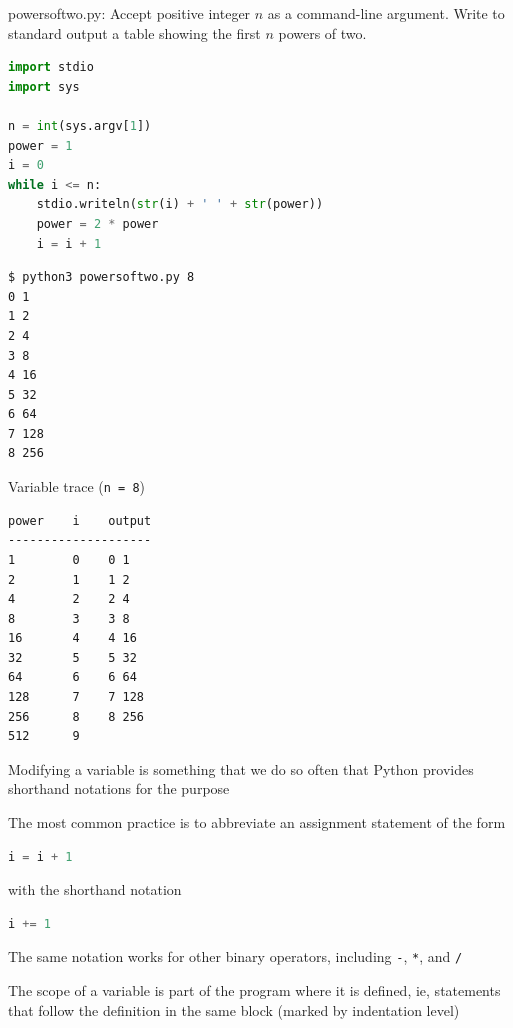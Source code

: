 \documentclass[8pt,a4paper,compress]{beamer}
\begin{document}
\begin{frame}[fragile]
\pause

\begin{framed}
\tiny powersoftwo.py: Accept positive integer $n$ as a command-line argument. Write to standard output a table showing the first $n$ powers of two.
\end{framed}

\begin{lstlisting}[language=Python]
import stdio
import sys

n = int(sys.argv[1])
power = 1
i = 0
while i <= n:
    stdio.writeln(str(i) + ' ' + str(power))    
    power = 2 * power
    i = i + 1
\end{lstlisting}

\pause

\begin{minipage}{150pt}
\begin{lstlisting}[language={}]
$ python3 powersoftwo.py 8
0 1
1 2
2 4
3 8
4 16
5 32
6 64
7 128
8 256
\end{lstlisting}
\end{minipage}\hfill
\begin{minipage}{100pt}
Variable trace (\lstinline{n = 8})
\begin{lstlisting}[language={}]
power    i    output
--------------------
1        0    0 1
2        1    1 2
4        2    2 4
8        3    3 8
16       4    4 16
32       5    5 32
64       6    6 64
128      7    7 128
256      8    8 256
512      9
\end{lstlisting}
\end{minipage}
\end{frame}

\begin{frame}[fragile]
\pause

Modifying a variable is something that we do so often that Python provides shorthand notations for the purpose

\pause
\bigskip

The most common practice is to abbreviate an assignment statement of the form 

\begin{lstlisting}[language=Python]
i = i + 1
\end{lstlisting}

with the shorthand notation

\begin{lstlisting}[language=Python]
i += 1
\end{lstlisting}

\pause
\bigskip

The same notation works for other binary operators, including \lstinline{-}, \lstinline{*}, and \lstinline{/}

\pause
\bigskip

The scope of a variable is part of the program where it is defined, ie, statements that follow the definition in the same block (marked by indentation level)
\end{frame}
\end{document}

